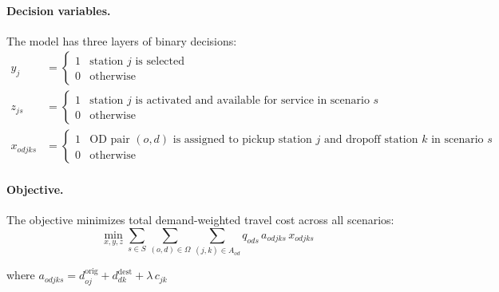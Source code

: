 \documentclass[11pt]{article}
\theoremstyle{definition}
\begin{document}
\paragraph{Decision variables.}
The model has three layers of binary decisions:
\begin{align*}
	y_j       & = \begin{cases} 1 & \text{station } j \text{ is selected } \\ 0 & \text{otherwise} \end{cases}                                                                               \\[6pt]
	z_{js}    & = \begin{cases} 1 & \text{station } j \text{ is activated and available for service in scenario } s \\ 0 & \text{otherwise} \end{cases}                                      \\[6pt]
	x_{odjks} & = \begin{cases} 1 & \text{OD pair } (o,d) \text{ is assigned to pickup station } j \text{ and dropoff station } k \text{ in scenario } s \\ 0 & \text{otherwise} \end{cases}
\end{align*}

\paragraph{Objective.}
The objective minimizes total demand-weighted travel cost across all scenarios:
\begin{equation}
	\min_{x,y,z}
	\sum_{s \in S} \sum_{(o,d) \in \Omega} \sum_{(j,k)\in A_{od}}
	q_{ods}\,a_{odjks}\,x_{odjks}
	\label{eq:nominal-obj}
\end{equation}

where $a_{odjks} = d^{\mathrm{orig}}_{oj} + d^{\mathrm{dest}}_{dk} + \lambda\,c_{jk}$
\end{document}
